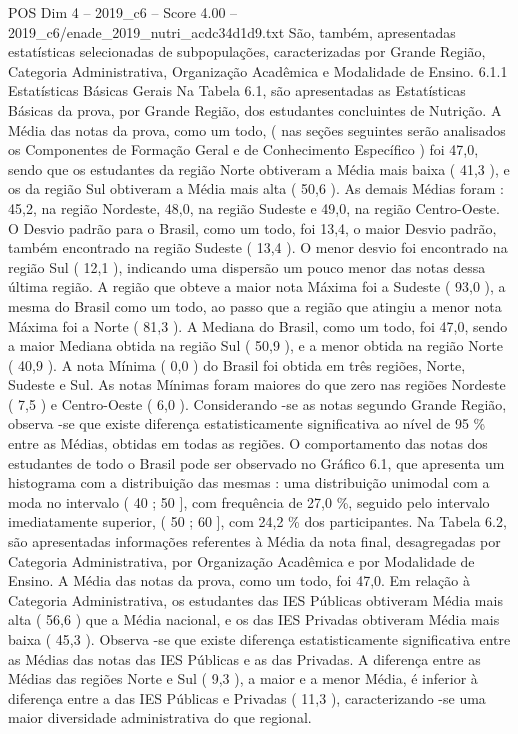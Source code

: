 \begin{textsample}{POS Dim 4 – 2019\_c6 – Score 4.00 – 2019\_c6/enade\_2019\_nutri\_acdc34d1d9.txt}
São, também, apresentadas estatísticas selecionadas de subpopulações, caracterizadas por Grande Região, Categoria Administrativa, Organização Acadêmica e Modalidade de Ensino. 6.1.1 Estatísticas Básicas Gerais Na Tabela 6.1, são apresentadas as Estatísticas Básicas da prova, por Grande Região, dos estudantes concluintes de Nutrição.
A Média das notas da prova, como um todo, ( nas seções seguintes serão analisados os Componentes de Formação Geral e de Conhecimento Específico ) foi 47,0, sendo que os estudantes da região Norte obtiveram a Média mais baixa ( 41,3 ), e os da região Sul obtiveram a Média mais alta ( 50,6 ).
As demais Médias foram : 45,2, na região Nordeste, 48,0, na região Sudeste e 49,0, na região Centro-Oeste.
O Desvio padrão para o Brasil, como um todo, foi 13,4, o maior Desvio padrão, também encontrado na região Sudeste ( 13,4 ).
O menor desvio foi encontrado na região Sul ( 12,1 ), indicando uma dispersão um pouco menor das notas dessa última região.
A região que obteve a maior nota Máxima foi a Sudeste ( 93,0 ), a mesma do Brasil como um todo, ao passo que a região que atingiu a menor nota Máxima foi a Norte ( 81,3 ).
A Mediana do Brasil, como um todo, foi 47,0, sendo a maior Mediana obtida na região Sul ( 50,9 ), e a menor obtida na região Norte ( 40,9 ).
A nota Mínima ( 0,0 ) do Brasil foi obtida em três regiões, Norte, Sudeste e Sul.
As notas Mínimas foram maiores do que zero nas regiões Nordeste ( 7,5 ) e Centro-Oeste ( 6,0 ).
Considerando -se as notas segundo Grande Região, observa -se que existe diferença estatisticamente significativa ao nível de 95 \% entre as Médias, obtidas em todas as regiões.
O comportamento das notas dos estudantes de todo o Brasil pode ser observado no Gráfico 6.1, que apresenta um histograma com a distribuição das mesmas : uma distribuição unimodal com a moda no intervalo ( 40 ; 50 ], com frequência de 27,0 \%, seguido pelo intervalo imediatamente superior, ( 50 ; 60 ], com 24,2 \% dos participantes.
Na Tabela 6.2, são apresentadas informações referentes à Média da nota final, desagregadas por Categoria Administrativa, por Organização Acadêmica e por Modalidade de Ensino.
A Média das notas da prova, como um todo, foi 47,0.
Em relação à Categoria Administrativa, os estudantes das IES Públicas obtiveram Média mais alta ( 56,6 ) que a Média nacional, e os das IES Privadas obtiveram Média mais baixa ( 45,3 ).
Observa -se que existe diferença estatisticamente significativa entre as Médias das notas das IES Públicas e as das Privadas.
A diferença entre as Médias das regiões Norte e Sul ( 9,3 ), a maior e a menor Média, é inferior à diferença entre a das IES Públicas e Privadas ( 11,3 ), caracterizando -se uma maior diversidade administrativa do que regional.

\end{textsample}
